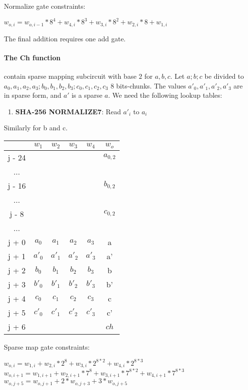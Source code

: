 Normalize gate constraints:
\begin{center}
$w_{o,i} = w_{o, i - 1} * 8^4 + w_{4,i}*8^3 + w_{3,i}* 8^2 + w_{2,i} * 8 + w_{1,i}$
\end{center}

The final addition requires one add gate.

\paragraph{The Ch function}
contain sparse mapping subcircuit with base $2$ for $a, b ,c$.
Let $a; b; c$ be divided to $a_0, a_1, a_2, a_3; b_0, b_1, b_2, b_3; c_0, c_1, c_2, c_3$ 8 bits-chunks.
The values $a'_0, a'_1, a'_2, a'_3$ are in sparse form, and $a'$ is a sparse $a$.
We need the following lookup tables:
\begin{enumerate}
\item \textbf{SHA-256 NORMALIZE7}: Read $a'_i$ to $a_i$
\end{enumerate}
Similarly for b and c. 
\begin{center}
\begin{tabular}{ |c|c|c|c|c|c } 
  & $w_1$ & $w_2$ & $w_3$ & $w_4$ & $w_o$\\ 
 \hline
j - 24 &  &  &  &  & $a_{0, 2}$\\ 
... &&&&& \\
j - 16 &  &  &  &  & $b_{0, 2}$\\ 
... &&&&& \\
j - 8 &  &  &  &  & $c_{0, 2}$\\ 
... &&&&& \\
j + 0 & $a_0$ & $ a_1$ & $a_2$ & $a_3$ & a\\ 
j + 1 & $a'_0$ & $a'_1$ & $a'_2$ & $a'_3$ & a' \\ 
j + 2 & $b_0$ & $ b_1$ & $b_2$ & $b_3$ & b\\ 
j + 3 & $b'_0$ & $b'_1$ & $b'_2$ & $b'_3$ & b' \\ 
j + 4 & $c_0$ & $ c_1$ & $c_2$ & $c_3$ & c\\ 
j + 5 & $c'_0$ & $c'_1$ & $c'_2$ & $c'_3$ & c' \\ 
j + 6 & &  &  &  & $ch$ \\ 
 \hline
\end{tabular}
\end{center}
Sparse map gate constraints:
\begin{center}
$w_{o,i} = w_{1,i} + w_{2,i}*2^8 + w_{3,i}*2^{8*2} + w_{4,i}*2^{8*3}$ \\
$w_{o,i+1} = w_{1,i+1} + w_{2,i+1}*7^8 + w_{3,i+1}*7^{8*2} + w_{4,i+1}*7^{8*3}$ \\

$w_{o, j+5} = w_{o,j+1} + 2*w_{o, j+3} + 3*w_{o, j+5}$ \\
\end{center}

